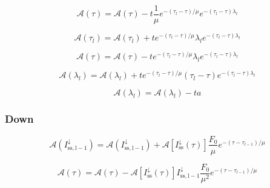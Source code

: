 \begin{equation}
\mathcal{A}(\tau) = \mathcal{A}(\tau) - t \frac{1}{\mu} e^{-(\tau_{l} - \tau) / \mu} e^{-(\tau_{l} - \tau) \lambda_{l}}
\label{eq:single_scattering-adjoint_of_tangent_linear-up-tau_a3}
\end{equation}

\begin{equation}
\mathcal{A}(\tau_{l}) = \mathcal{A}(\tau_{l})+ t e^{-(\tau_{l} - \tau) / \mu} \lambda_{l} e^{-(\tau_{l} - \tau) \lambda_{l}}
\label{eq:single_scattering-adjoint_of_tangent_linear-up-tau_l_a3}
\end{equation}

\begin{equation}
\mathcal{A}(\tau) = \mathcal{A}(\tau) - t e^{-(\tau_{l} - \tau) / \mu} \lambda_{l} e^{-(\tau_{l} - \tau) \lambda_{l}}
\label{eq:single_scattering-adjoint_of_tangent_linear-up-tau_a4}
\end{equation}

\begin{equation}
\mathcal{A}(\lambda_{l}) = \mathcal{A}(\lambda_{l}) + t e^{-(\tau_{l} - \tau) / \mu} (\tau_{l} - \tau) e^{-(\tau_{l} - \tau) \lambda_{l}}
\label{eq:single_scattering-adjoint_of_tangent_linear-up-lambda_l_a3}
\end{equation}

\begin{equation}
\mathcal{A}(\lambda_{l}) = \mathcal{A}(\lambda_{l}) - t a
\label{eq:single_scattering-adjoint_of_tangent_linear-up-lambda_l_a4}
\end{equation}


%
\subsubsection{Down}
\label{sec:single_scattering-adjoint_of_tangent_linear-down}

\begin{equation}
\mathcal{A}(I^{\downarrow}_{\mathrm{ss,l-1}}) = \mathcal{A}(I^{\downarrow}_{\mathrm{ss,l-1}}) + \mathcal{A}\left[I^{\downarrow}_{\mathrm{ss}}(\tau)\right]\frac{F_{0}}{\mu} e^{-(\tau - \tau_{l-1}) / \mu}
\label{eq:single_scattering-adjoint_of_tangent_linear-down-I_down-ss_l_m_1}
\end{equation}

\begin{equation}
\mathcal{A}(\tau) = \mathcal{A}(\tau) - \mathcal{A}\left[I^{\downarrow}_{\mathrm{ss}}(\tau)\right] I^{\downarrow}_{\mathrm{ss,l-1}} \frac{F_{0}}{\mu^{2}} e^{-(\tau - \tau_{l-1}) / \mu}
\label{eq:single_scattering-adjoint_of_tangent_linear-down-tau_a}
\end{equation}

